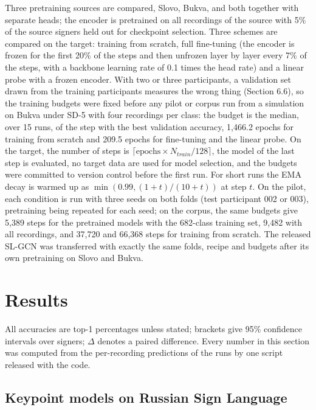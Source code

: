\documentclass[a4paper,fleqn]{cas-dc}
\begin{document}
Three pretraining sources are compared, Slovo, Bukva, and both together with separate heads; the encoder is pretrained on all recordings of the source with 5\% of the source signers held out for checkpoint selection. Three schemes are compared on the target: training from scratch, full fine-tuning (the encoder is frozen for the first 20\% of the steps and then unfrozen layer by layer every 7\% of the steps, with a backbone learning rate of 0.1 times the head rate) and a linear probe with a frozen encoder. With two or three participants, a validation set drawn from the training participants measures the wrong thing (Section 6.6), so the training budgets were fixed before any pilot or corpus run from a simulation on Bukva under SD-5 with four recordings per class: the budget is the median, over 15 runs, of the step with the best validation accuracy, 1,466.2 epochs for training from scratch and 209.5 epochs for fine-tuning and the linear probe. On the target, the number of steps is \(\lceil \text{epochs} \times N_{train}/128 \rceil\), the model of the last step is evaluated, no target data are used for model selection, and the budgets were committed to version control before the first run. For short runs the EMA decay is warmed up as \(\min(0.99, (1+t)/(10+t))\) at step \(t\). On the pilot, each condition is run with three seeds on both folds (test participant 002 or 003), pretraining being repeated for each seed; on the corpus, the same budgets give 5,389 steps for the pretrained models with the 682-class training set, 9,482 with all recordings, and 37,720 and 66,368 steps for training from scratch. The released SL-GCN was transferred with exactly the same folds, recipe and budgets after its own pretraining on Slovo and Bukva.

\hypertarget{results}{%
\section{Results}\label{results}}

All accuracies are top-1 percentages unless stated; brackets give 95\% confidence intervals over signers; \(\Delta\) denotes a paired difference. Every number in this section was computed from the per-recording predictions of the runs by one script released with the code.

\hypertarget{keypoint-models-on-russian-sign-language}{%
\subsection{Keypoint models on Russian Sign Language}\label{keypoint-models-on-russian-sign-language}}
\end{document}
